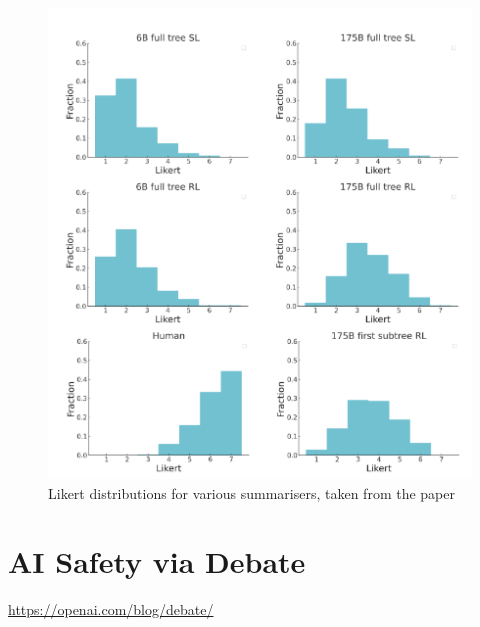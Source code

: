 \begin{figure}
    \centering
    \includegraphics[width=.95\linewidth]{images/likert-distros.png}
    \caption{Likert distributions for various summarisers, taken from the paper}
    \label{fig:likert}
\end{figure}


\section{AI Safety via Debate}

\url{https://openai.com/blog/debate/}

